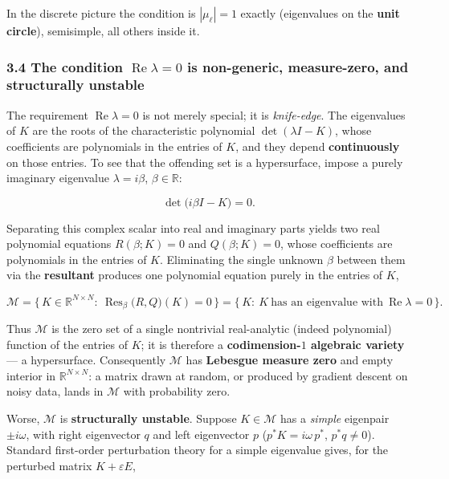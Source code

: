 \documentclass[
  11pt,
]{article}
\begin{document}
In the discrete picture the condition is \(|\mu_\ell| = 1\) exactly
(eigenvalues on the \textbf{unit circle}), semisimple, all others inside
it.

\subsubsection{\texorpdfstring{3.4 The condition
\(\operatorname{Re}\lambda=0\) is non-generic, measure-zero, and
structurally
unstable}{3.4 The condition \textbackslash operatorname\{Re\}\textbackslash lambda=0 is non-generic, measure-zero, and structurally unstable}}\label{the-condition-operatornamerelambda0-is-non-generic-measure-zero-and-structurally-unstable}

The requirement \(\operatorname{Re}\lambda=0\) is not merely special; it
is \emph{knife-edge}. The eigenvalues of \(K\) are the roots of the
characteristic polynomial \(\det(\lambda I-K)\), whose coefficients are
polynomials in the entries of \(K\), and they depend
\textbf{continuously} on those entries. To see that the offending set is
a hypersurface, impose a purely imaginary eigenvalue \(\lambda=i\beta\),
\(\beta\in\mathbb{R}\):

\[
\det\!\big(i\beta I-K\big)=0 .
\]

Separating this complex scalar into real and imaginary parts yields two
real polynomial equations \(R(\beta;K)=0\) and \(Q(\beta;K)=0\), whose
coefficients are polynomials in the entries of \(K\). Eliminating the
single unknown \(\beta\) between them via the \textbf{resultant}
produces one polynomial equation purely in the entries of \(K\),

\[
\mathcal{M}=\Big\{\,K\in\mathbb{R}^{N\times N}:\ \operatorname{Res}_{\beta}\!\big(R,Q\big)(K)=0\,\Big\}
=\{\,K:\ K\ \text{has an eigenvalue with}\ \operatorname{Re}\lambda=0\,\}.
\]

Thus \(\mathcal{M}\) is the zero set of a single nontrivial
real-analytic (indeed polynomial) function of the entries of \(K\); it
is therefore a \textbf{codimension-\(1\) algebraic variety} --- a
hypersurface. Consequently \(\mathcal{M}\) has \textbf{Lebesgue measure
zero} and empty interior in \(\mathbb{R}^{N\times N}\): a matrix drawn
at random, or produced by gradient descent on noisy data, lands in
\(\mathcal{M}\) with probability zero.

Worse, \(\mathcal{M}\) is \textbf{structurally unstable}. Suppose
\(K\in\mathcal{M}\) has a \emph{simple} eigenpair \(\pm i\omega\), with
right eigenvector \(q\) and left eigenvector \(p\)
(\(p^{*}K=i\omega\,p^{*}\), \(p^{*}q\ne0\)). Standard first-order
perturbation theory for a simple eigenvalue gives, for the perturbed
matrix \(K+\varepsilon E\),
\end{document}
